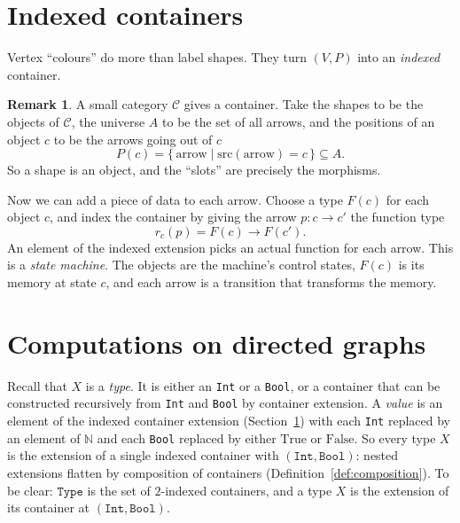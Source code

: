 \documentclass[11pt, a4paper]{article}
\theoremstyle{definition}
\newtheorem{remark}[definition]{Remark}
\theoremstyle{plain}
\begin{document}
\section{Indexed containers}\label{sec:indexed}

\begin{center}
\colorbox{blue!10}{\parbox{0.9\linewidth}{\centering
Vertex ``colours'' do more than label shapes.  They turn $(V, P)$ into an
\emph{indexed} container.}}
\end{center}



\begin{remark}\label{rem:category-container}
A small category $\mathcal{C}$ gives a container.  Take the shapes to be
the objects of $\mathcal{C}$, the universe $A$ to be the set of all
arrows, and the positions of an object $c$ to be the arrows going out
of $c$
\[
  P(c) = \{\, \mathrm{arrow} \mid \mathrm{src}(\mathrm{arrow}) = c \,\}
  \subseteq A.
\]
So a shape is an object, and the ``slots'' are precisely the
morphisms.

Now we can add a piece of data to each arrow.  Choose a type
$F(c)$ for each object $c$, and index the container by giving the
arrow $p : c \to c'$ the function type
\[
  r_c(p) = F(c) \to F(c').
\]
An element of the indexed extension picks an actual function for
each arrow.  This is a \emph{state machine}.  The objects are the machine's
control states, $F(c)$ is its memory at state $c$, and each arrow
is a transition that transforms the memory.
\end{remark}


\section{Computations on directed graphs}\label{sec:computations}

Recall that $X$ is a \emph{type}.  It is either an \texttt{Int} or a
\texttt{Bool}, or a container that can be constructed recursively
from \texttt{Int} and \texttt{Bool} by container extension.  A
\emph{value} is an element of the indexed container extension
(Section~\ref{sec:indexed}) with each \texttt{Int} replaced by an
element of $\mathbb{N}$ and each \texttt{Bool} replaced by either
$\mathrm{True}$ or $\mathrm{False}$.  So
every type $X$ is the extension of a single indexed container with
$(\texttt{Int}, \texttt{Bool})$: nested extensions flatten by
composition of containers (Definition~\ref{def:composition}).  To be
clear: $\texttt{Type}$ is the set of $2$-indexed containers, and a
type $X$ is the extension of its container at
$(\texttt{Int}, \texttt{Bool})$.
\end{document}
